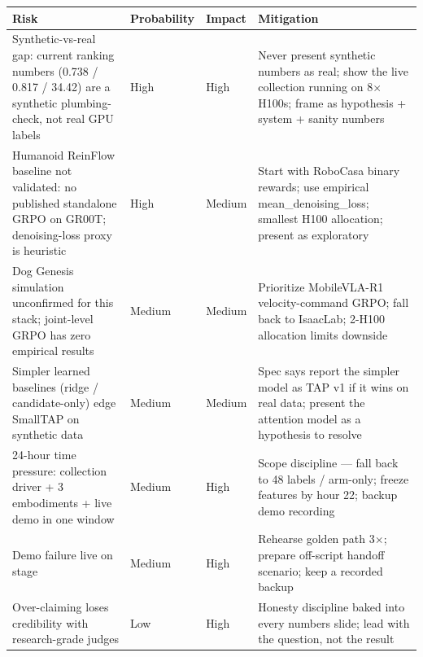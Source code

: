 \documentclass[11pt,letterpaper]{article}
\begin{document}
\begin{center}
\begin{tabular}{llll}
\toprule
Risk & Probability & Impact & Mitigation \\
\midrule
Synthetic-vs-real gap: current ranking numbers (0.738 / 0.817 / 34.42) are a synthetic plumbing-check, not real GPU labels & High & High & Never present synthetic numbers as real; show the live collection running on 8$\times$H100s; frame as hypothesis + system + sanity numbers \\
Humanoid ReinFlow baseline not validated: no published standalone GRPO on GR00T; denoising-loss proxy is heuristic & High & Medium & Start with RoboCasa binary rewards; use empirical mean\_denoising\_loss; smallest H100 allocation; present as exploratory \\
Dog Genesis simulation unconfirmed for this stack; joint-level GRPO has zero empirical results & Medium & Medium & Prioritize MobileVLA-R1 velocity-command GRPO; fall back to IsaacLab; 2-H100 allocation limits downside \\
Simpler learned baselines (ridge / candidate-only) edge SmallTAP on synthetic data & Medium & Medium & Spec says report the simpler model as TAP v1 if it wins on real data; present the attention model as a hypothesis to resolve \\
24-hour time pressure: collection driver + 3 embodiments + live demo in one window & Medium & High & Scope discipline --- fall back to 48 labels / arm-only; freeze features by hour 22; backup demo recording \\
Demo failure live on stage & Medium & High & Rehearse golden path 3$\times$; prepare off-script handoff scenario; keep a recorded backup \\
Over-claiming loses credibility with research-grade judges & Low & High & Honesty discipline baked into every numbers slide; lead with the question, not the result \\
\bottomrule
\end{tabular}
\end{center}
\end{document}
